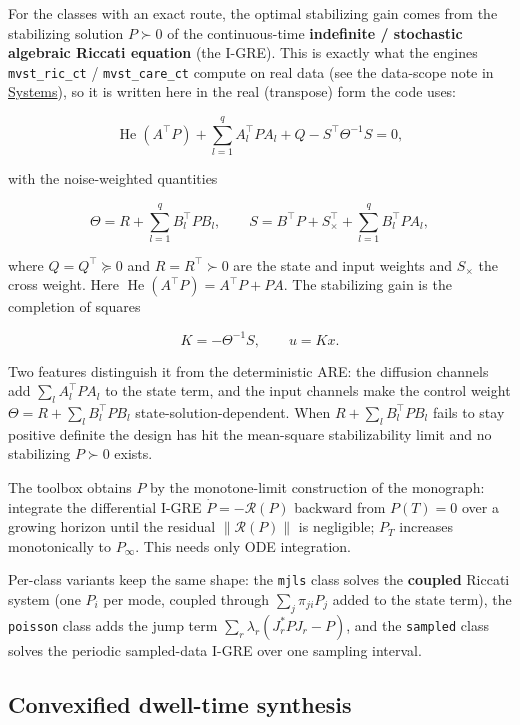 \documentclass[11pt,oneside]{report}
\newcommand{\code}[1]{\texttt{#1}}
\begin{document}
For the classes with an exact route, the optimal stabilizing gain comes from the
stabilizing solution \(P\succ0\) of the continuous-time \textbf{indefinite / stochastic
algebraic Riccati equation} (the I-GRE). This is exactly what the engines
\code{mvst\_ric\_ct} / \code{mvst\_care\_ct} compute on real data (see the data-scope note in
\protect\hyperlink{chap:02-systems}{Systems}), so it is written here in the real (transpose) form the
code uses:

\[\operatorname{He}(A^{\top}P)+\sum_{l=1}^{q}A_l^{\top}P A_l+Q-S^{\top}\Theta^{-1}S=0,\]

with the noise-weighted quantities

\[\Theta=R+\sum_{l=1}^{q}B_l^{\top}P B_l,\qquad S=B^{\top}P+S_{\times}^{\top}+\sum_{l=1}^{q}B_l^{\top}P A_l,\]

where \(Q=Q^{\top}\succeq0\) and \(R=R^{\top}\succ0\) are the state and input weights
and \(S_{\times}\) the cross weight. Here \(\operatorname{He}(A^{\top}P)=A^{\top}P+PA\).
The stabilizing gain is the completion of squares

\[K=-\Theta^{-1}S,\qquad u=Kx.\]

Two features distinguish it from the deterministic ARE: the diffusion channels
add \(\sum_l A_l^{\top}P A_l\) to the state term, and the input channels make the
control weight \(\Theta=R+\sum_l B_l^{\top}P B_l\) state-solution-dependent. When
\(R+\sum_l B_l^{\top}PB_l\) fails to stay positive definite the design has hit the
mean-square stabilizability limit and no stabilizing \(P\succ0\) exists.

The toolbox obtains \(P\) by the monotone-limit construction of the monograph:
integrate the differential I-GRE \(\dot P=-\mathcal{R}(P)\) backward from
\(P(T)=0\) over a growing horizon until the residual \(\|\mathcal{R}(P)\|\) is
negligible; \(P_T\) increases monotonically to \(P_\infty\). This needs only ODE
integration.

Per-class variants keep the same shape: the \code{mjls} class solves the \textbf{coupled}
Riccati system (one \(P_i\) per mode, coupled through \(\sum_j\pi_{ji}P_j\) added to
the state term), the \code{poisson} class adds the jump term
\(\sum_r\lambda_r(J_r^{*}P J_r-P)\), and the \code{sampled} class solves the periodic
sampled-data I-GRE over one sampling interval.

\hypertarget{convexified-dwell-time-synthesis}{%
\subsection{Convexified dwell-time synthesis}\label{convexified-dwell-time-synthesis}}
\end{document}
